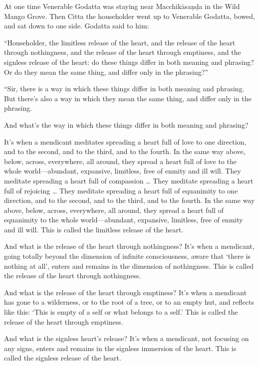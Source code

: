 \documentclass[12pt,openany]{book}%
\begin{document}
At one time Venerable Godatta was staying near \textsanskrit{Macchikāsaṇḍa} in the Wild Mango Grove. Then Citta the householder went up to Venerable Godatta, bowed, and sat down to one side. Godatta said to him: 

“Householder, the limitless release of the heart, and the release of the heart through nothingness, and the release of the heart through emptiness, and the signless release of the heart: do these things differ in both meaning and phrasing? Or do they mean the same thing, and differ only in the phrasing?” 

“Sir, there is a way in which these things differ in both meaning and phrasing. But there’s also a way in which they mean the same thing, and differ only in the phrasing. 

And what’s the way in which these things differ in both meaning and phrasing? 

It’s when a mendicant meditates spreading a heart full of love to one direction, and to the second, and to the third, and to the fourth. In the same way above, below, across, everywhere, all around, they spread a heart full of love to the whole world—abundant, expansive, limitless, free of enmity and ill will. They meditate spreading a heart full of compassion … They meditate spreading a heart full of rejoicing … They meditate spreading a heart full of equanimity to one direction, and to the second, and to the third, and to the fourth. In the same way above, below, across, everywhere, all around, they spread a heart full of equanimity to the whole world—abundant, expansive, limitless, free of enmity and ill will. This is called the limitless release of the heart. 

And what is the release of the heart through nothingness? It’s when a mendicant, going totally beyond the dimension of infinite consciousness, aware that ‘there is nothing at all’, enters and remains in the dimension of nothingness. This is called the release of the heart through nothingness. 

And what is the release of the heart through emptiness? It’s when a mendicant has gone to a wilderness, or to the root of a tree, or to an empty hut, and reflects like this: ‘This is empty of a self or what belongs to a self.’ This is called the release of the heart through emptiness. 

And what is the signless heart’s release? It’s when a mendicant, not focusing on any signs, enters and remains in the signless immersion of the heart. This is called the signless release of the heart. 
\end{document}
